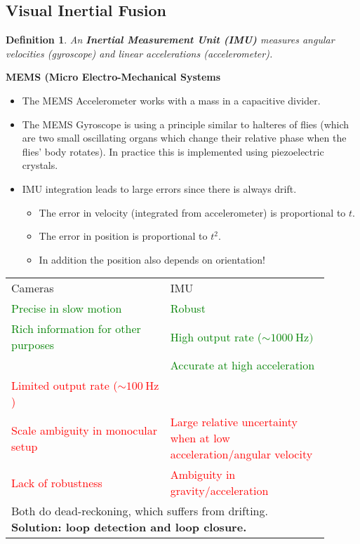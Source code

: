 \documentclass[10pt,a4paper]{scrartcl}
\newtheorem{define}{Definition}
\begin{document}
\begin{multicols*}{2}
\section{Visual Inertial Fusion}

\begin{define}
An \textbf{Inertial Measurement Unit (IMU)} measures angular velocities (gyroscope) and linear accelerations (accelerometer).
\end{define}

\textbf{MEMS (Micro Electro-Mechanical Systems}


\begin{itemize}
\item The MEMS Accelerometer works with a mass in a capacitive divider.
\item The MEMS Gyroscope is using a principle similar to halteres of flies (which are two small oscillating organs which change their relative phase when the flies' body rotates). In practice this is implemented using piezoelectric crystals.
\item IMU integration leads to large errors since there is always drift.
\begin{itemize}
\item The error in velocity (integrated from accelerometer) is proportional to $t$.
\item The error in position is proportional to $t^2$.
\item In addition the position also depends on orientation!
\end{itemize}
\end{itemize}

\begin{tabular}{p{0.45\linewidth}p{0.45\linewidth}}
Cameras&IMU\\
\textcolor{green}{Precise in slow motion}&\textcolor{green}{Robust}\\
\textcolor{green}{Rich information for other purposes}&\textcolor{green}{High output rate ($\sim\SI{1000}{\hertz})$}\\
&\textcolor{green}{Accurate at high acceleration}\\
\textcolor{red}{Limited output rate ($\sim\SI{100}{\hertz}$)}&\\
\textcolor{red}{Scale ambiguity in monocular setup}&\textcolor{red}{Large relative uncertainty when at low acceleration/angular velocity}\\
\textcolor{red}{Lack of robustness}&\textcolor{red}{Ambiguity in gravity/acceleration}\\
\multicolumn{2}{p{\linewidth}}{Both do dead-reckoning, which suffers from drifting. \textbf{Solution: loop detection and loop closure.}}
\end{tabular}


\end{multicols*}
\end{document}
